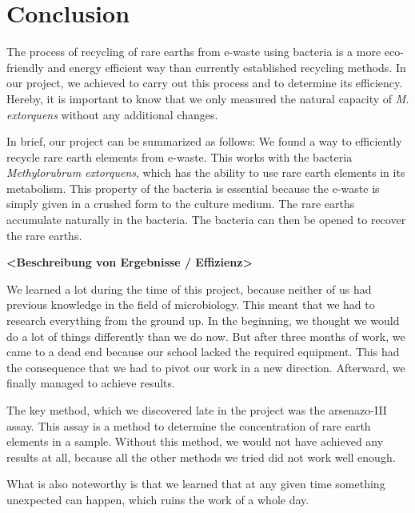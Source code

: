 \chapter{Conclusion\authorA{}}
The process of recycling of rare earths from e-waste using bacteria is a more eco-friendly and energy efficient way than currently established recycling methods.
In our project, we achieved to carry out this process and to determine its efficiency.
Hereby, it is important to know that we only measured the natural capacity of \emph{M. extorquens} without any additional changes.

In brief, our project can be summarized as follows:
We found a way to efficiently recycle rare earth elements from e-waste.
This works with the bacteria \emph{Methylorubrum extorquens}, which has the ability to use rare earth elements in its metabolism.
This property of the bacteria is essential because the e-waste is simply given in a crushed form to the culture medium.
The rare earths accumulate naturally in the bacteria.
The bacteria can then be opened to recover the rare earths.

\textbf{<Beschreibung von Ergebnisse / Effizienz>}

We learned a lot during the time of this project, because neither of us had previous knowledge in the field of microbiology.
This meant that we had to research everything from the ground up.
In the beginning, we thought we would do a lot of things differently than we do now.
But after three months of work, we came to a dead end because our school lacked the required equipment.
This had the consequence that we had to pivot our work in a new direction.
Afterward, we finally managed to achieve results.

The key method, which we discovered late in the project was the arsenazo-III assay.
This assay is a method to determine the concentration of rare earth elements in a sample.
Without this method, we would not have achieved any results at all, because all the other methods we tried did not work well enough.

What is also noteworthy is that we learned that at any given time something unexpected can happen, which ruins the work of a whole day.
